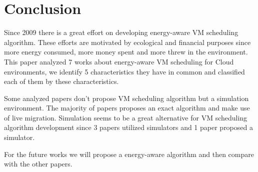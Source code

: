 \documentclass{article}
\begin{document}








\section{Conclusion}

Since 2009 there is a great effort on developing energy-aware VM scheduling algorithm. These efforts are motivated by ecological and financial purposes since more energy consumed, more money spent and more  threw in the environment. This paper analyzed 7 works about energy-aware VM scheduling for Cloud environments, we identify 5 characteristics they have in common and classified each of them by these characteristics. 

Some analyzed papers don't propose VM scheduling algorithm but a simulation environment. The majority of papers proposes an exact algorithm and make use of live migration. Simulation seems to be a great alternative for VM scheduling algorithm development since 3 papers utilized simulators and 1 paper proposed a simulator. 

For the future works we will propose a energy-aware algorithm and then compare with the other papers.



\end{document}
